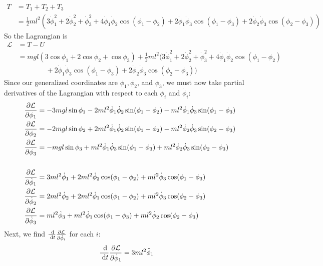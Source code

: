 \documentclass{article}
\renewcommand{\L}{\mathcal{L}}
\begin{document}
\begin{appendices}
\begin{align}
        T &= T_1 + T_2 + T_3 \\
        &= \frac{1}{2}ml^2 \left( 3\dot\phi_1^2+2\dot\phi_2^2+\dot\phi_3^2
           + 4\dot\phi_1\dot\phi_2\cos(\phi_1-\phi_2)
           + 2\dot\phi_1\dot\phi_3\cos(\phi_1-\phi_3)
           + 2\dot\phi_2\dot\phi_3\cos(\phi_2-\phi_3) \right) 
    \end{align}
    So the Lagrangian is
    \begin{align}
        \L &= T - U \\
        &= mgl\left(3\cos\phi_1+2\cos\phi_2+\cos\phi_3 \right) 
           + \frac{1}{2}ml^2 \bigl( 3\dot\phi_1^2+2\dot\phi_2^2+\dot\phi_3^2
           + 4\dot\phi_1\dot\phi_2\cos(\phi_1-\phi_2) \\
        &\qquad\qquad + 2\dot\phi_1\dot\phi_3\cos(\phi_1-\phi_3)
           + 2\dot\phi_2\dot\phi_3\cos(\phi_2-\phi_3) \bigr) 
    \end{align}
    Since our generalized coordinates are $\phi_1,\phi_2$, and $\phi_3$, we must
    now take partial derivatives of the Lagrangian with respect to each $\phi_i$
    and $\dot\phi_i$:
    \begin{align}
        \pD{\L}{\phi_1} &= -3mgl\sin\phi_1 
            -2ml^2\dot\phi_1\dot\phi_2\sin(\phi_1-\phi_2)
            -ml^2\dot\phi_1\dot\phi_3\sin(\phi_1-\phi_3) \\
        \pD{\L}{\phi_2} &= -2mgl\sin\phi_2 
            +2ml^2\dot\phi_1\dot\phi_2\sin(\phi_1-\phi_2)
            -ml^2\dot\phi_2\dot\phi_3\sin(\phi_2-\phi_3) \\
        \pD{\L}{\phi_3} &= -mgl\sin\phi_3 
            +ml^2\dot\phi_1\dot\phi_3\sin(\phi_1-\phi_3)
            +ml^2\dot\phi_2\dot\phi_3\sin(\phi_2-\phi_3) \\\\
        \pD{\L}{\dot\phi_1} &= 3ml^2\dot\phi_1 
            + 2ml^2\dot\phi_2\cos(\phi_1-\phi_2) 
            + ml^2\dot\phi_3\cos(\phi_1-\phi_3)  \\
        \pD{\L}{\dot\phi_2} &= 2ml^2\dot\phi_2 
            + 2ml^2\dot\phi_1\cos(\phi_1-\phi_2) 
            + ml^2\dot\phi_3\cos(\phi_2-\phi_3)  \\
        \pD{\L}{\dot\phi_3} &= ml^2\dot\phi_3 
            + ml^2\dot\phi_1\cos(\phi_1-\phi_3) 
            + ml^2\dot\phi_2\cos(\phi_2-\phi_3) 
    \end{align}
    Next, we find $\D{}{t}\pD{\L}{\dot\phi_i}$ for each $i$:
    \begin{align}
        \D{}{t}\pD{\L}{\dot\phi_1} &= 3ml^2\ddot\phi_1 

\end{align}
\end{appendices}
\end{document}
